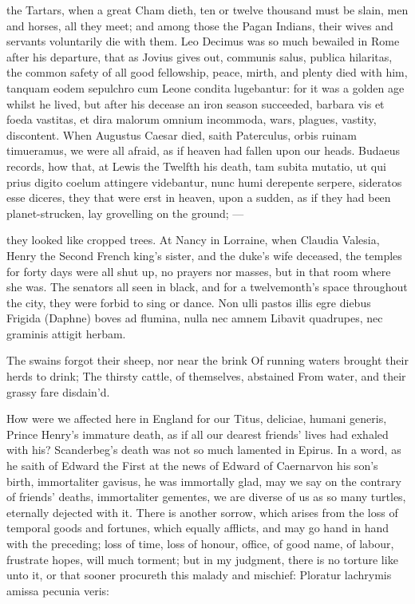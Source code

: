 {{the Tartars, when a great Cham dieth, ten or twelve thousand must
be slain, men and horses, all they meet; and among those the
Pagan Indians, their wives and servants voluntarily die with
them. Leo Decimus was so much bewailed in Rome after his departure,
that as Jovius gives out, communis salus, publica hilaritas, the
common safety of all good fellowship, peace, mirth, and plenty died
with him, tanquam eodem sepulchro cum Leone condita lugebantur: for it
was a golden age whilst he lived, but after his decease an iron
season succeeded, barbara vis et foeda vastitas, et dira malorum omnium
incommoda, wars, plagues, vastity, discontent. When Augustus Caesar
died, saith Paterculus, orbis ruinam timueramus, we were all afraid, as
if heaven had fallen upon our heads. Budaeus records, how that,
at Lewis the Twelfth his death, tam subita mutatio, ut qui prius digito
coelum attingere videbantur, nunc humi derepente serpere, sideratos
esse diceres, they that were erst in heaven, upon a sudden, as if they
had been planet-strucken, lay grovelling on the ground;
---

they looked like cropped trees. At Nancy in Lorraine, when
Claudia Valesia, Henry the Second French king's sister, and the duke's
wife deceased, the temples for forty days were all shut up, no prayers
nor masses, but in that room where she was. The senators all seen in
black, and for a twelvemonth's space throughout the city, they were
forbid to sing or dance.
Non ulli pastos illis egre diebus
Frigida (Daphne) boves ad flumina, nulla nec amnem
Libavit quadrupes, nec graminis attigit herbam.

The swains forgot their sheep, nor near the brink
Of running waters brought their herds to drink;
The thirsty cattle, of themselves, abstained
From water, and their grassy fare disdain'd.

How were we affected here in England for our Titus, deliciae, humani
generis, Prince Henry's immature death, as if all our dearest friends'
lives had exhaled with his? Scanderbeg's death was not so much
lamented in Epirus. In a word, as he saith of Edward the First at
the news of Edward of Caernarvon his son's birth, immortaliter gavisus,
he was immortally glad, may we say on the contrary of friends' deaths,
immortaliter gementes, we are diverse of us as so many turtles,
eternally dejected with it.
There is another sorrow, which arises from the loss of temporal goods
and fortunes, which equally afflicts, and may go hand in hand with the
preceding; loss of time, loss of honour, office, of good name, of
labour, frustrate hopes, will much torment; but in my judgment, there
is no torture like unto it, or that sooner procureth this malady and
mischief:
Ploratur lachrymis amissa pecunia veris:

}}
